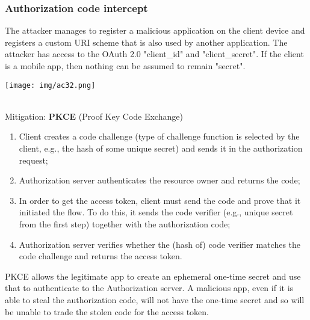 \documentclass[a4paper, 10pt, titlepage]{article}
\begin{document}
\subsubsection{Authorization code intercept}
\begin{minipage}{0.5\textwidth}
The attacker manages to register a malicious application on the client device and registers a custom URI scheme that is also used by another application. The attacker has access to the OAuth 2.0 "client\_id" and "client\_secret". If the client is a mobile app, then nothing can be assumed to remain "secret".
\end{minipage}
\hfill
\begin{minipage}{0.45\textwidth}
\begin{center}
\texttt{[image: img/ac32.png]}
\end{center}
\end{minipage}\medskip\\
Mitigation: \textbf{PKCE} (Proof Key Code Exchange)
\begin{enumerate} 
\item Client creates a code challenge (type of challenge function is selected by the client, e.g., the hash of some unique secret) and
sends it in the authorization request;
\item Authorization server authenticates the resource owner and returns the code;
\item In order to get the access token, client must send the code and prove that it initiated the flow. To do this, it sends the code verifier (e.g., unique secret from the first step) together with the authorization code;
\item Authorization server verifies whether the (hash of) code verifier matches the code challenge and returns the access token.
\end{enumerate}
PKCE allows the legitimate app to create an ephemeral one-time secret
and use that to authenticate to the Authorization server. A malicious app, even if it is able to steal the authorization code, will not
have the one-time secret and so will be unable to trade the stolen code for the access token.
\end{document}

